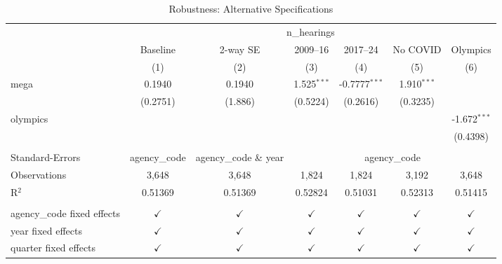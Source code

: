 \begin{table}[t]
\centering
\caption{Robustness: Alternative Specifications}
\label{tab:robustness}
\footnotesize
\begingroup
\centering
\begin{adjustbox}{max width=\textwidth}
\begin{tabular}{lcccccc}
   \toprule
    & \multicolumn{6}{c}{n\_hearings}\\
                               & Baseline      & 2-way SE      & 2009--16      & 2017--24        & No COVID      & Olympics \\   
                               & (1)           & (2)           & (3)           & (4)             & (5)           & (6)\\  
   \midrule 
   mega                        & 0.1940        & 0.1940        & 1.525$^{***}$ & -0.7777$^{***}$ & 1.910$^{***}$ &   \\   
                               & (0.2751)      & (1.886)       & (0.5224)      & (0.2616)        & (0.3235)      &   \\   
   olympics                    &               &               &               &                 &               & -1.672$^{***}$\\   
                               &               &               &               &                 &               & (0.4398)\\   
    \\
   Standard-Errors & agency\_code & agency\_code \& year & \multicolumn{4}{c}{agency\_code} \\ 
   Observations                & 3,648         & 3,648         & 1,824         & 1,824           & 3,192         & 3,648\\  
   R$^2$                       & 0.51369       & 0.51369       & 0.52824       & 0.51031         & 0.52313       & 0.51415\\  
    \\
   agency\_code fixed effects  & $\checkmark$  & $\checkmark$  & $\checkmark$  & $\checkmark$    & $\checkmark$  & $\checkmark$\\   
   year fixed effects          & $\checkmark$  & $\checkmark$  & $\checkmark$  & $\checkmark$    & $\checkmark$  & $\checkmark$\\   
   quarter fixed effects       & $\checkmark$  & $\checkmark$  & $\checkmark$  & $\checkmark$    & $\checkmark$  & $\checkmark$\\   
   \bottomrule
\end{tabular}
\end{adjustbox}
\par\endgroup
\par{}
\end{table}
